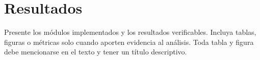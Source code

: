 \section{Resultados}

Presente los módulos implementados y los resultados verificables. Incluya
tablas, figuras o métricas solo cuando aporten evidencia al análisis. Toda tabla
y figura debe mencionarse en el texto y tener un título descriptivo.
